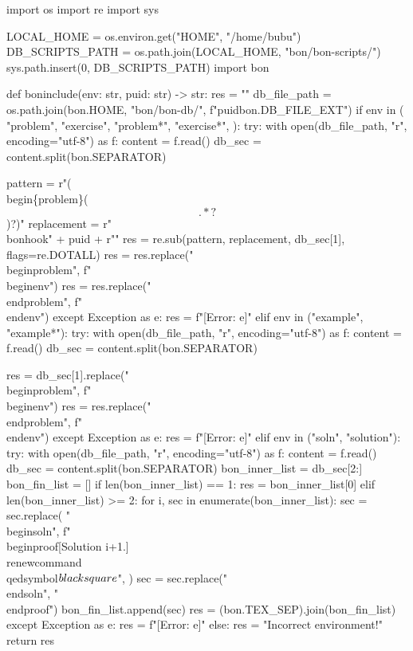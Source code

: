 \begin{pycode}
import os
import re
import sys

LOCAL_HOME = os.environ.get("HOME", "/home/bubu")
DB_SCRIPTS_PATH = os.path.join(LOCAL_HOME, "bon/bon-scripts/")
sys.path.insert(0, DB_SCRIPTS_PATH)
import bon


def boninclude(env: str, puid: str) -> str:
    res = ""
    db_file_path = os.path.join(bon.HOME, "bon/bon-db/", f"{puid}{bon.DB_FILE_EXT}")
    if env in (
        "problem",
        "exercise",
        "problem*",
        "exercise*",
    ):
        try:
            with open(db_file_path, "r", encoding="utf-8") as f:
                content = f.read()
            db_sec = content.split(bon.SEPARATOR)

            pattern = r"(\\begin\{problem\}\s*(\[.*?\])?)"
            replacement = r"\1\n\\bonhook{" + puid + r"}"
            res = re.sub(pattern, replacement, db_sec[1], flags=re.DOTALL)
            res = res.replace("\\begin{problem}", f"\\begin{{{env}}}")
            res = res.replace("\\end{problem}", f"\\end{{{env}}}")
        except Exception as e:
            res = f"[Error: {e}]"
    elif env in ("example", "example*"):
        try:
            with open(db_file_path, "r", encoding="utf-8") as f:
                content = f.read()
            db_sec = content.split(bon.SEPARATOR)

            res = db_sec[1].replace("\\begin{problem}", f"\\begin{{{env}}}")
            res = res.replace("\\end{problem}", f"\\end{{{env}}}")
        except Exception as e:
            res = f"[Error: {e}]"
    elif env in ("soln", "solution"):
        try:
            with open(db_file_path, "r", encoding="utf-8") as f:
                content = f.read()
            db_sec = content.split(bon.SEPARATOR)
            bon_inner_list = db_sec[2:]
            bon_fin_list = []
            if len(bon_inner_list) == 1:
                res = bon_inner_list[0]
            elif len(bon_inner_list) >= 2:
                for i, sec in enumerate(bon_inner_list):
                    sec = sec.replace(
                        "\\begin{soln}",
                        f"\\begin{{proof}}[Solution {i+1}.]\\renewcommand{{\\qedsymbol}}{{$\\blacksquare$}}",
                    )
                    sec = sec.replace("\\end{soln}", "\\end{proof}")
                    bon_fin_list.append(sec)
                res = (bon.TEX_SEP).join(bon_fin_list)
        except Exception as e:
            res = f"[Error: {e}]"
    else:
        res = "Incorrect environment!"
    return res
\end{pycode}

